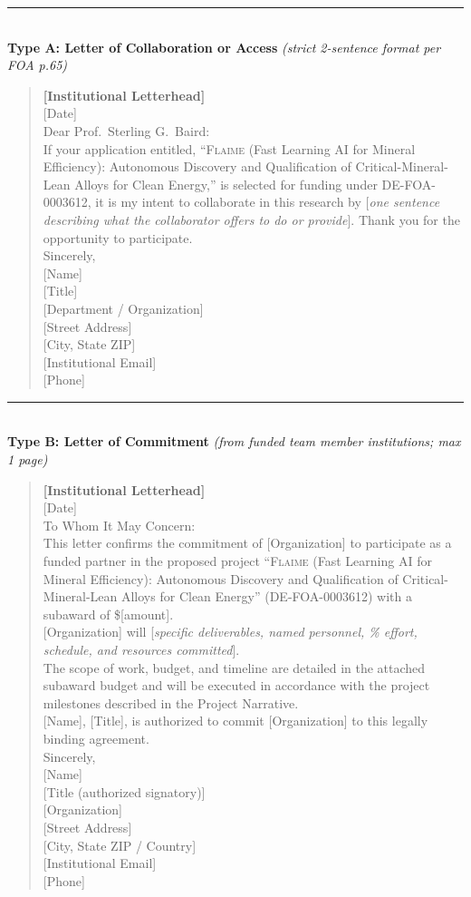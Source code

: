 \documentclass[11pt,letterpaper]{article}
\newcommand{\flaime}{\textsc{Flaime}}
\newcommand{\projecttitle}{\flaime{} (Fast Learning AI for Mineral
Efficiency): Autonomous Discovery and Qualification of
Critical-Mineral-Lean Alloys for Clean Energy}
\begin{document}
\medskip
\noindent\rule{\textwidth}{0.4pt}\\
\textbf{Type A: Letter of Collaboration or Access} \textit{(strict 2-sentence format per FOA p.65)}
\smallskip

\begin{quote}\small
\textbf{{[}Institutional Letterhead{]}}\\[4pt]
{[}Date{]}\\[6pt]
Dear Prof.\ Sterling G.\ Baird:\\[4pt]
If your application entitled, ``\projecttitle{},'' is selected for
funding under DE-FOA-0003612, it is my intent to collaborate in this
research by {[}\emph{one sentence describing what the collaborator
offers to do or provide}{]}.
Thank you for the opportunity to participate.\\[12pt]
Sincerely,\\[4pt]
{[}Name{]}\\
{[}Title{]}\\
{[}Department / Organization{]}\\
{[}Street Address{]}\\
{[}City, State ZIP{]}\\
{[}Institutional Email{]}\\
{[}Phone{]}
\end{quote}

\medskip
\noindent\rule{\textwidth}{0.4pt}\\
\textbf{Type B: Letter of Commitment} \textit{(from funded team member institutions; max 1 page)}
\smallskip

\begin{quote}\small
\textbf{{[}Institutional Letterhead{]}}\\[4pt]
{[}Date{]}\\[6pt]
To Whom It May Concern:\\[4pt]
This letter confirms the commitment of {[}Organization{]} to participate as a
funded partner in the proposed project ``\projecttitle{}''
(DE-FOA-0003612) with a subaward of \${[}amount{]}.\\[4pt]
{[}Organization{]} will {[}\emph{specific deliverables, named personnel,
\% effort, schedule, and resources committed}{]}.\\[4pt]
The scope of work, budget, and timeline are detailed in the attached subaward
budget and will be executed in accordance with the project milestones
described in the Project Narrative.\\[4pt]
{[}Name{]}, {[}Title{]}, is authorized to commit {[}Organization{]} to this
legally binding agreement.\\[12pt]
Sincerely,\\[4pt]
{[}Name{]}\\
{[}Title (authorized signatory){]}\\
{[}Organization{]}\\
{[}Street Address{]}\\
{[}City, State ZIP / Country{]}\\
{[}Institutional Email{]}\\
{[}Phone{]}
\end{quote}
\end{document}
